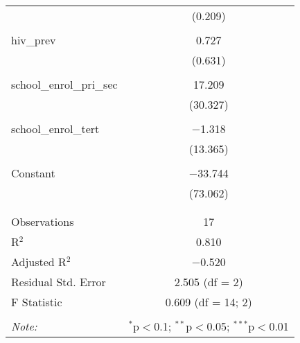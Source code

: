 \begin{table}[!htbp]
\begin{tabular}{@{\extracolsep{5pt}}lc}
  & (0.209) \\ 
  & \\ 
 hiv\_prev & 0.727 \\ 
  & (0.631) \\ 
  & \\ 
 school\_enrol\_pri\_sec & 17.209 \\ 
  & (30.327) \\ 
  & \\ 
 school\_enrol\_tert & $-$1.318 \\ 
  & (13.365) \\ 
  & \\ 
 Constant & $-$33.744 \\ 
  & (73.062) \\ 
  & \\ 
\hline \\[-1.8ex] 
Observations & 17 \\ 
R$^{2}$ & 0.810 \\ 
Adjusted R$^{2}$ & $-$0.520 \\ 
Residual Std. Error & 2.505 (df = 2) \\ 
F Statistic & 0.609 (df = 14; 2) \\ 
\hline 
\hline \\[-1.8ex] 
\textit{Note:}  & \multicolumn{1}{r}{$^{*}$p$<$0.1; $^{**}$p$<$0.05; $^{***}$p$<$0.01} \\ 
\end{tabular} 
\end{table} 
